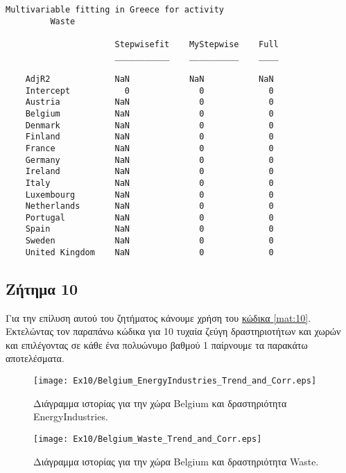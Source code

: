 \documentclass[11pt]{scrartcl} %
\begin{document}
\begin{Verbatim}[fontsize=\small]
Multivariable fitting in Greece for activity
 	 	 Waste

                      Stepwisefit    MyStepwise    Full
                      ___________    __________    ____

    AdjR2             NaN            NaN           NaN 
    Intercept           0              0             0 
    Austria           NaN              0             0 
    Belgium           NaN              0             0 
    Denmark           NaN              0             0 
    Finland           NaN              0             0 
    France            NaN              0             0 
    Germany           NaN              0             0 
    Ireland           NaN              0             0 
    Italy             NaN              0             0 
    Luxembourg        NaN              0             0 
    Netherlands       NaN              0             0 
    Portugal          NaN              0             0 
    Spain             NaN              0             0 
    Sweden            NaN              0             0 
    United Kingdom    NaN              0             0 
\end{Verbatim}








\subsection{Ζήτημα 10}
\label{subsec:z10}


Για την επίλυση αυτού του ζητήματος κάνουμε χρήση του \hyperref[mat:10]{κώδικα \ref*{mat:10}}. Εκτελώντας τον παραπάνω κώδικα για 10 τυχαία ζεύγη δραστηριοτήτων και χωρών και επιλέγοντας σε κάθε ένα πολυώνυμο βαθμού 1 παίρνουμε τα παρακάτω αποτελέσματα.



\begin{figure}[H]

	\centering
	\texttt{[image: Ex10/Belgium\_EnergyIndustries\_Trend\_and\_Corr.eps]}	
\caption{Διάγραμμα ιστορίας για την χώρα Belgium και δραστηριότητα EnergyIndustries.}
\label{fig:z101} 
\end{figure}


\begin{figure}[H]
 
	\centering
	\texttt{[image: Ex10/Belgium\_Waste\_Trend\_and\_Corr.eps]}	
\caption{Διάγραμμα ιστορίας για την χώρα Belgium και δραστηριότητα Waste.}
\label{fig:z102}
\end{figure}
\end{document}
